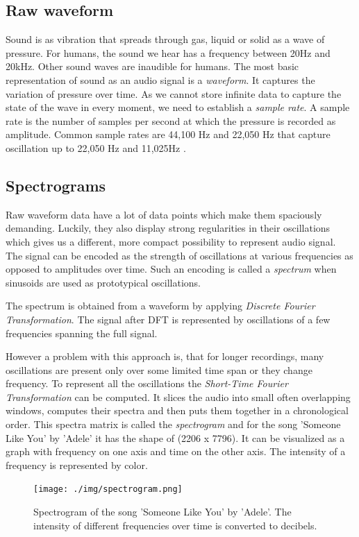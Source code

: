 \subsection{Raw waveform}
Sound is as vibration that spreads through gas, liquid or solid as a wave of pressure. For humans, the sound we hear has a frequency between 20Hz and 20kHz. Other sound waves are inaudible for humans. The most basic representation of sound as an audio signal is a \textit{waveform}. It captures the variation of pressure over time. As we cannot store infinite data to capture the state of the wave in every moment, we need to establish a \textit{sample rate}. A sample rate is the number of samples per second at which the pressure is recorded as amplitude. Common sample rates are 44,100 Hz and 22,050 Hz that capture oscillation up to 22,050 Hz and 11,025Hz \cite{Schluter2017}.

\subsection{Spectrograms}
Raw waveform data have a lot of data points which make them spaciously demanding. Luckily, they also display strong regularities in their oscillations which gives us a different, more compact possibility to represent audio signal. The signal can be encoded as the strength of oscillations at various frequencies as opposed to amplitudes over time. Such an encoding is called a \textit{spectrum} when sinusoids are used as prototypical oscillations.

The spectrum is obtained from a waveform by applying \textit{Discrete Fourier Transformation}. The signal after DFT is represented by oscillations of a few frequencies spanning the full signal. 

However a problem with this approach is, that for longer recordings, many oscillations are present only over some limited time span or they change frequency. To represent all the oscillations the \textit{Short-Time Fourier Transformation} can be computed. It slices the audio into small often overlapping windows, computes their spectra and then puts them together in a chronological order. This spectra matrix is called the \textit{spectrogram} and for the song 'Someone Like You' by 'Adele' it has the shape of (2206 x 7796). It can be visualized as a graph with frequency on one axis and time on the other axis. The intensity of a frequency is represented by color.

\begin{figure}[h!]
    \centering
	\texttt{[image: ./img/spectrogram.png]}
	\caption{Spectrogram of the song 'Someone Like You' by 'Adele'. The intensity of different frequencies over time is converted to decibels.}
	\label{fig:ilustrative_specrogram}
\end{figure}


